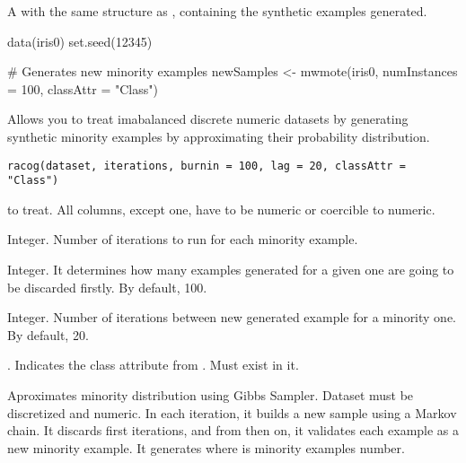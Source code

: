 %
\begin{Value}
A  with the same structure as ,
containing the synthetic examples generated.
\end{Value}
%
\begin{Examples}
\begin{ExampleCode}
data(iris0)
set.seed(12345)

# Generates new minority examples
newSamples <- mwmote(iris0, numInstances = 100, classAttr = "Class")

\end{ExampleCode}
\end{Examples}
%
\begin{Description}\relax
Allows you to treat imabalanced discrete numeric datasets by generating
synthetic minority examples by approximating their probability distribution.
\end{Description}
%
\begin{Usage}
\begin{verbatim}
racog(dataset, iterations, burnin = 100, lag = 20, classAttr = "Class")
\end{verbatim}
\end{Usage}
%
\begin{Arguments}
\begin{ldescription}
\item[\code{dataset}]  to treat. All columns, except
 one, have to be numeric or coercible to numeric.

\item[\code{iterations}] Integer. Number of iterations to run for each minority
example.

\item[\code{burnin}] Integer. It determines how many examples generated for a given
one are going to be discarded firstly. By default, 100.

\item[\code{lag}] Integer. Number of iterations between new generated example for a
minority one. By default, 20.

\item[\code{classAttr}] . Indicates the class attribute from
. Must exist in it.
\end{ldescription}
\end{Arguments}
%
\begin{Details}\relax
Aproximates minority distribution using Gibbs Sampler. Dataset must be
discretized and numeric. In each iteration, it builds a new sample using a
Markov chain. It discards first  iterations, and from then on,
it validates each  example as a new minority example. It generates
 where  is minority examples number.
\end{Details}
